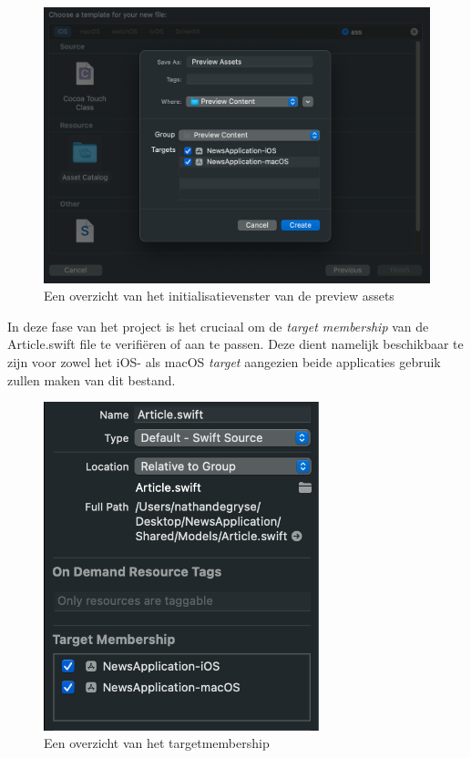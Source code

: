 \begin{figure}[!h]
    \centering
    \includegraphics[width=\linewidth]{img/previewassets.png}
    \caption{Een overzicht van het initialisatievenster van de preview assets}
\end{figure}

\pagebreak 
In deze fase van het project is het cruciaal om de \textit{target membership} van de Article.swift file te verifiëren of aan te passen. Deze dient namelijk beschikbaar te zijn voor zowel het iOS- als macOS \textit{target} aangezien beide applicaties gebruik zullen maken van dit bestand.

\begin{figure}[!h]
    \centering
    \includegraphics[width=80mm, scale=0.5]{img/articletargetmembership.png}
    \caption{Een overzicht van het targetmembership}
\end{figure}

